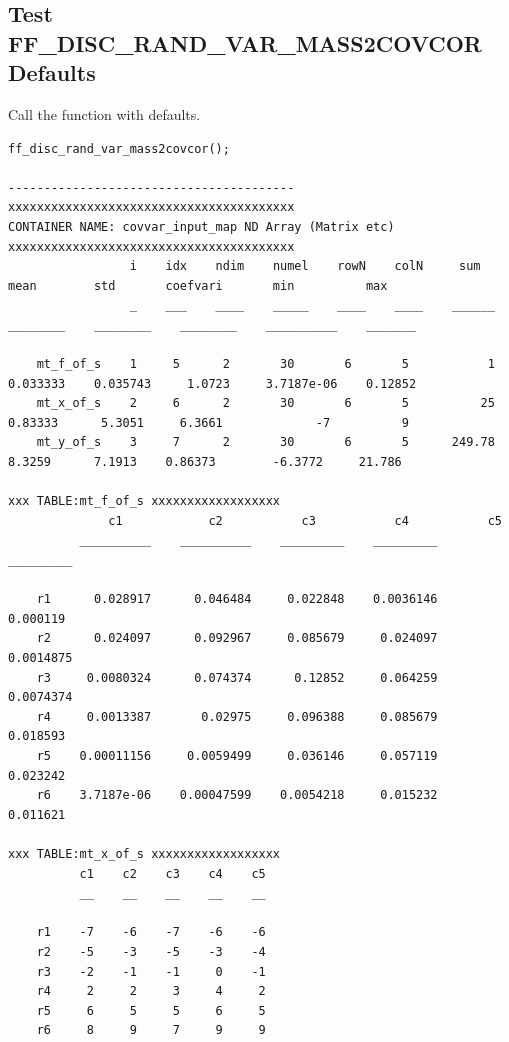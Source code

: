 \documentclass[
]{book}
\begin{document}
\hypertarget{test-ff_disc_rand_var_mass2covcor-defaults}{%
\subsection{Test FF\_DISC\_RAND\_VAR\_MASS2COVCOR Defaults}\label{test-ff_disc_rand_var_mass2covcor-defaults}}

Call the function with defaults.

\begin{verbatim}
ff_disc_rand_var_mass2covcor();

----------------------------------------
xxxxxxxxxxxxxxxxxxxxxxxxxxxxxxxxxxxxxxxx
CONTAINER NAME: covvar_input_map ND Array (Matrix etc)
xxxxxxxxxxxxxxxxxxxxxxxxxxxxxxxxxxxxxxxx
                 i    idx    ndim    numel    rowN    colN     sum        mean        std       coefvari       min          max  
                 _    ___    ____    _____    ____    ____    ______    ________    ________    ________    __________    _______

    mt_f_of_s    1     5      2       30       6       5           1    0.033333    0.035743     1.0723     3.7187e-06    0.12852
    mt_x_of_s    2     6      2       30       6       5          25     0.83333      5.3051     6.3661             -7          9
    mt_y_of_s    3     7      2       30       6       5      249.78      8.3259      7.1913    0.86373        -6.3772     21.786

xxx TABLE:mt_f_of_s xxxxxxxxxxxxxxxxxx
              c1            c2           c3           c4           c5    
          __________    __________    _________    _________    _________

    r1      0.028917      0.046484     0.022848    0.0036146     0.000119
    r2      0.024097      0.092967     0.085679     0.024097    0.0014875
    r3     0.0080324      0.074374      0.12852     0.064259    0.0074374
    r4     0.0013387       0.02975     0.096388     0.085679     0.018593
    r5    0.00011156     0.0059499     0.036146     0.057119     0.023242
    r6    3.7187e-06    0.00047599    0.0054218     0.015232     0.011621

xxx TABLE:mt_x_of_s xxxxxxxxxxxxxxxxxx
          c1    c2    c3    c4    c5
          __    __    __    __    __

    r1    -7    -6    -7    -6    -6
    r2    -5    -3    -5    -3    -4
    r3    -2    -1    -1     0    -1
    r4     2     2     3     4     2
    r5     6     5     5     6     5
    r6     8     9     7     9     9


\end{verbatim}
\end{document}
